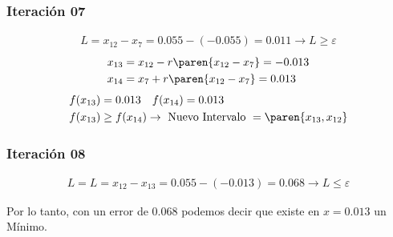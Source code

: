 \begin{homeworkProblem}
\subsubsection{Iteración 07}
\begin{align*}
    L=x_{12}-x_7=0.055-(-0.055)=0.011 \rightarrow L \geq \varepsilon
\end{align*}
\begin{align*}
    &x_{13}=x_{12} - r\paren{x_{12}-x_7}= -0.013\\
    &x_{14}=x_7 + r\paren{x_{12}-x_7}= 0.013
\end{align*}
\begin{align*}
    &f(x_{13})=0.013 \quad f(x_{14})=0.013\\
    &f(x_{13}) \geq f(x_{14}) \rightarrow \text{ Nuevo Intervalo } = \paren{x_{13},x_{12}}
\end{align*}

\subsubsection{Iteración 08}
\begin{align*}
    L=L=x_{12}-x_{13}=0.055-(-0.013)=0.068\rightarrow L \leq \varepsilon
\end{align*}

Por lo tanto, con un error de $0.068$ podemos decir que existe en $x=0.013$ un Mínimo.

\end{homeworkProblem}